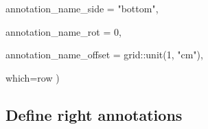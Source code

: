 \documentclass[
]{article}
\newenvironment{Shaded}{\begin{snugshade}}{\end{snugshade}}
\newcommand{\AttributeTok}[1]{\textcolor[rgb]{0.77,0.63,0.00}{#1}}
\newcommand{\DecValTok}[1]{\textcolor[rgb]{0.00,0.00,0.81}{#1}}
\newcommand{\FunctionTok}[1]{\textcolor[rgb]{0.00,0.00,0.00}{#1}}
\newcommand{\NormalTok}[1]{#1}
\newcommand{\SpecialCharTok}[1]{\textcolor[rgb]{0.00,0.00,0.00}{#1}}
\newcommand{\StringTok}[1]{\textcolor[rgb]{0.31,0.60,0.02}{#1}}
\begin{document}
\begin{Shaded}
\begin{Highlighting}[]
  \AttributeTok{annotation\_name\_side =} \StringTok{"bottom"}\NormalTok{,}

  \AttributeTok{annotation\_name\_rot =} \DecValTok{0}\NormalTok{,}

  \AttributeTok{annotation\_name\_offset =}\NormalTok{ grid}\SpecialCharTok{::}\FunctionTok{unit}\NormalTok{(}\DecValTok{1}\NormalTok{, }\StringTok{"cm"}\NormalTok{),}

  \AttributeTok{which=}\StringTok{\textquotesingle{}row\textquotesingle{}}
\NormalTok{)}
\end{Highlighting}
\end{Shaded}

\hypertarget{define-right-annotations}{%
\subsection{Define right annotations}\label{define-right-annotations}}
\end{document}
